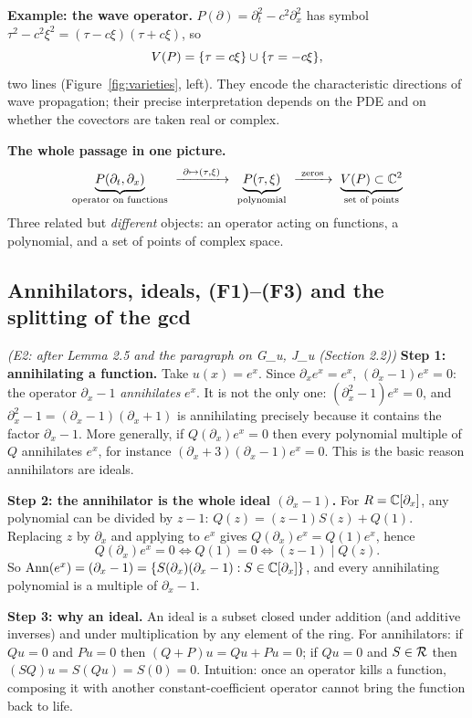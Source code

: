 \medskip\textbf{Example: the wave operator.} $P(\partial)=\partial_t^2-c^2\partial_x^2$ has symbol $\tau^2-c^2\xi^2=(\tau-c\xi)(\tau+c\xi)$, so
\[
V(P)=\{\tau=c\xi\}\cup\{\tau=-c\xi\},
\]
two lines (Figure~\ref{fig:varieties}, left). They encode the characteristic directions of wave propagation; their precise interpretation depends on the PDE and on whether the covectors are taken real or complex.

\medskip\textbf{The whole passage in one picture.}
\[
\underbrace{P(\partial_t,\partial_x)}_{\text{operator on functions}}\ \xrightarrow{\ \partial\mapsto(\tau,\xi)\ }\ \underbrace{P(\tau,\xi)}_{\text{polynomial}}\ \xrightarrow{\ \text{zeros}\ }\ \underbrace{\Var(P)\subset\C^2}_{\text{set of points}}
\]
Three related but \emph{different} objects: an operator acting on functions, a polynomial, and a set of points of complex space.

\subsection{Annihilators, ideals, (F1)--(F3) and the splitting of the gcd}\label{expl:E2}
\noindent\emph{(E2: after Lemma 2.5 and the paragraph on G\_u, J\_u (Section 2.2))}
\textbf{Step 1: annihilating a function.} Take $u(x)=e^{x}$. Since $\partial_xe^x=e^x$, $(\partial_x-1)e^x=0$: the operator $\partial_x-1$ \emph{annihilates} $e^x$. It is not the only one: $(\partial_x^2-1)e^x=0$, and $\partial_x^2-1=(\partial_x-1)(\partial_x+1)$ is annihilating precisely because it contains the factor $\partial_x-1$. More generally, if $Q(\partial_x)e^x=0$ then every polynomial multiple of $Q$ annihilates $e^x$, for instance $(\partial_x+3)(\partial_x-1)e^x=0$. This is the basic reason annihilators are ideals.

\medskip\textbf{Step 2: the annihilator is the whole ideal $(\partial_x-1)$.} For $R=\mathbb{C}[\partial_x]$, any polynomial can be divided by $z-1$: $Q(z)=(z-1)S(z)+Q(1)$. Replacing $z$ by $\partial_x$ and applying to $e^x$ gives $Q(\partial_x)e^x=Q(1)e^x$, hence
\[
Q(\partial_x)e^x=0\iff Q(1)=0\iff(z-1)\mid Q(z).
\]
So $\operatorname{Ann}(e^x)=(\partial_x-1)=\{S(\partial_x)(\partial_x-1):S\in\mathbb{C}[\partial_x]\}$, and every annihilating polynomial is a multiple of $\partial_x-1$.

\medskip\textbf{Step 3: why an ideal.} An ideal is a subset closed under addition (and additive inverses) and under multiplication by any element of the ring. For annihilators: if $Qu=0$ and $Pu=0$ then $(Q+P)u=Qu+Pu=0$; if $Qu=0$ and $S\in\mathcal{R}$ then $(SQ)u=S(Qu)=S(0)=0$. Intuition: once an operator kills a function, composing it with another constant-coefficient operator cannot bring the function back to life.

